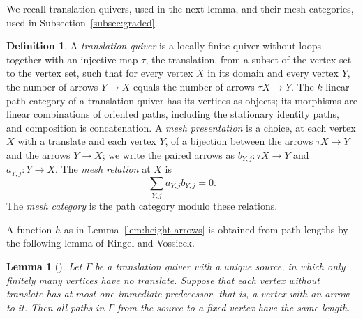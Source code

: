 \documentclass[a4paper,reqno,10pt]{amsart}
\newtheorem{lemma}[theorem]{Lemma}
\theoremstyle{definition}
\newtheorem{definition}[theorem]{Definition}
\numberwithin{equation}{section}
\begin{document}
We recall translation quivers, used in the next lemma, and their mesh
categories, used in Subsection~\ref{subsec:graded}.
\begin{definition}\label{def:mesh}
A \emph{translation quiver} is a locally
finite quiver without loops together with an injective map \(\tau\), the
translation, from a subset of the vertex set to the vertex set, such that for every
vertex \(X\) in its domain and every vertex \(Y\), the number of arrows
\(Y\to X\) equals the number of arrows \(\tau X\to Y\).
The \(k\)-linear path category of a translation quiver has its vertices as
objects; its morphisms are linear combinations of oriented paths, including
the stationary identity paths, and composition is concatenation.
A \emph{mesh presentation}
is a choice, at each vertex \(X\) with a translate and each vertex \(Y\), of a
bijection between the arrows \(\tau X\to Y\) and the arrows \(Y\to X\); we
write the paired arrows as \(b_{Y,j}:\tau X\to Y\) and
\(a_{Y,j}:Y\to X\). The \emph{mesh relation}
at \(X\) is
\[
 \sum_{Y,j}a_{Y,j}b_{Y,j}=0.
\]
The \emph{mesh category} is the path category modulo these relations.
\end{definition}

A function \(h\) as in Lemma~\ref{lem:height-arrows} is obtained from path
lengths by the following lemma of Ringel and Vossieck.
\begin{lemma}[{\cite[Section~7, Lemma, pp.~234--235]{RV}}]\label{lem:rv-grading}
Let \(\Gamma\) be a translation quiver with a unique source, in which only
finitely many vertices have no translate. Suppose that each vertex without translate
has at most one immediate predecessor, that is, a vertex with an arrow to
it. Then all paths in \(\Gamma\) from the
source to a fixed vertex have the same length.
\end{lemma}
\end{document}
